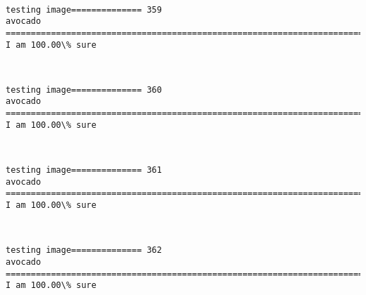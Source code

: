 \documentclass[11pt]{article}
\begin{document}
    \begin{center}
    \end{center}
    { \hspace*{\fill} \\}
    
    \begin{Verbatim}[commandchars=\\\{\}]
testing image============== 359
avocado
============================================================================
I am 100.00\% sure

    \end{Verbatim}

    \begin{center}
    \end{center}
    { \hspace*{\fill} \\}
    
    \begin{Verbatim}[commandchars=\\\{\}]
testing image============== 360
avocado
============================================================================
I am 100.00\% sure

    \end{Verbatim}

    \begin{center}
    \end{center}
    { \hspace*{\fill} \\}
    
    \begin{Verbatim}[commandchars=\\\{\}]
testing image============== 361
avocado
============================================================================
I am 100.00\% sure

    \end{Verbatim}

    \begin{center}
    \end{center}
    { \hspace*{\fill} \\}
    
    \begin{Verbatim}[commandchars=\\\{\}]
testing image============== 362
avocado
============================================================================
I am 100.00\% sure

    \end{Verbatim}
\end{document}
